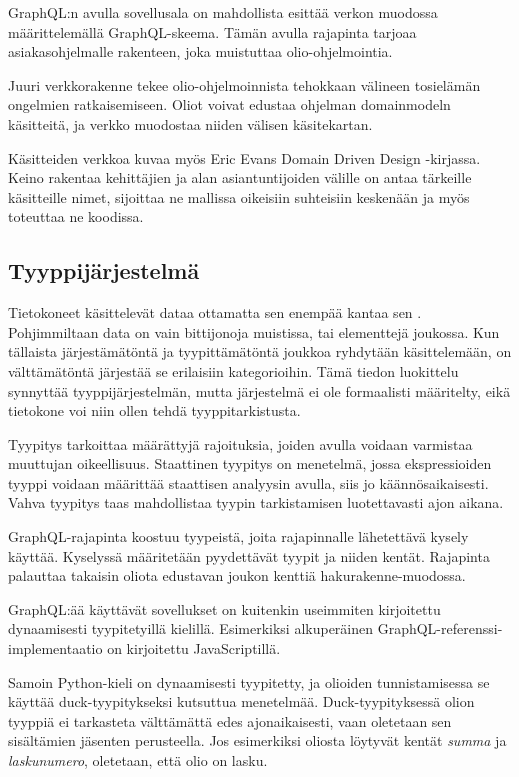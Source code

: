 GraphQL:n avulla sovellusala on mahdollista esittää verkon muodossa
määrittelemällä GraphQL-skeema. Tämän avulla rajapinta tarjoaa
asiakasohjelmalle rakenteen, joka muistuttaa
olio-ohjelmointia.\cite{thinkingInGraphs}

Juuri verkkorakenne tekee olio-ohjelmoinnista tehokkaan välineen
tosielämän ongelmien ratkaisemiseen. Oliot voivat edustaa ohjelman
\gls{domainmodel}n käsitteitä, ja verkko muodostaa niiden välisen
käsitekartan.

Käsitteiden verkkoa kuvaa myös Eric Evans Domain Driven Design
-kirjassa. Keino rakentaa  kehittäjien ja alan
asiantuntijoiden välille on antaa tärkeille käsitteille nimet, sijoittaa
ne mallissa oikeisiin suhteisiin keskenään ja myös toteuttaa ne
koodissa.

\hypertarget{tyyppijuxe4rjestelmuxe4}{%
\subsection{Tyyppijärjestelmä}\label{tyyppijuxe4rjestelmuxe4}}

Tietokoneet käsittelevät dataa ottamatta sen enempää kantaa sen
. Pohjimmiltaan data on vain bittijonoja
muistissa, tai elementtejä joukossa. Kun tällaista järjestämätöntä ja
tyypittämätöntä joukkoa ryhdytään käsittelemään, on välttämätöntä
järjestää se erilaisiin kategorioihin. Tämä tiedon luokittelu synnyttää
tyyppijärjestelmän, mutta järjestelmä ei ole formaalisti määritelty,
eikä tietokone voi niin ollen tehdä tyyppitarkistusta.

Tyypitys tarkoittaa määrättyjä rajoituksia, joiden avulla voidaan
varmistaa muuttujan oikeellisuus. Staattinen tyypitys on menetelmä,
jossa ekspressioiden tyyppi voidaan määrittää staattisen analyysin
avulla, siis jo käännösaikaisesti. Vahva tyypitys taas mahdollistaa
tyypin tarkistamisen luotettavasti ajon aikana.
\cite{Cardelli+Wegner:1985}

GraphQL-rajapinta koostuu tyypeistä, joita rajapinnalle lähetettävä
kysely käyttää. Kyselyssä määritetään pyydettävät tyypit ja niiden
kentät. Rajapinta palauttaa takaisin oliota edustavan joukon kenttiä
\gls{hakurakenne}-muodossa. \cite{graphql:spec}

GraphQL:ää käyttävät sovellukset on kuitenkin useimmiten kirjoitettu
dynaamisesti tyypitetyillä kielillä. Esimerkiksi alkuperäinen
GraphQL-referenssi-implementaatio on kirjoitettu
JavaScriptillä.\cite{graphqlRefImple2021Oct}

Samoin Python-kieli on dynaamisesti tyypitetty, ja olioiden
tunnistamisessa se käyttää duck-tyypitykseksi kutsuttua menetelmää.
Duck-tyypityksessä olion tyyppiä ei tarkasteta välttämättä edes
ajonaikaisesti, vaan oletetaan sen sisältämien jäsenten
perusteella.\cite{pythonGloss2021Oct} Jos esimerkiksi oliosta löytyvät
kentät \emph{summa} ja \emph{laskunumero}, oletetaan, että olio on
lasku.

